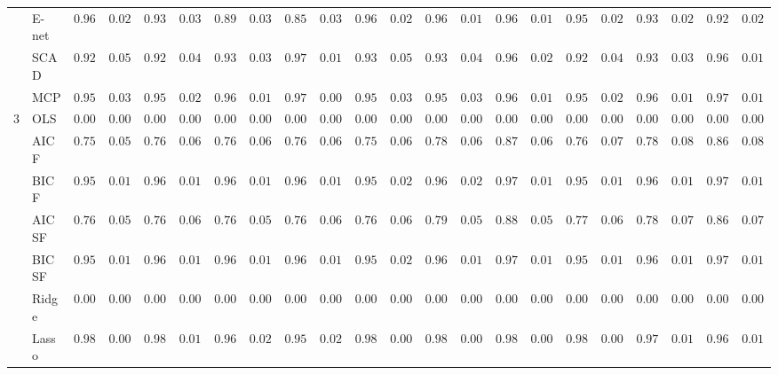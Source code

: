\begin{tabular}{ll|ll|llllll|llllll|llllll}
 & E-net  & $0.9635$ & $0.0264$ & $0.9316$ & $0.0325$ & $0.8913$ & $0.0322$ & $0.8589$ & $0.0355$ & $0.9657$ & $0.0226$ & $0.9644$ & $0.0138$ & $0.9618$ & $0.0133$ & $0.9551$ & $0.0232$ & $0.9386$ & $0.0252$ & $0.9218$ & $0.0224$ \\
 & SCAD  & $0.9227$ & $0.0595$ & $0.9282$ & $0.0421$ & $0.9399$ & $0.0310$ & $0.9729$ & $0.0104$ & $0.9359$ & $0.0539$ & $0.9344$ & $0.0465$ & $0.9665$ & $0.0258$ & $0.9208$ & $0.0498$ & $0.9397$ & $0.0361$ & $0.9625$ & $0.0165$ \\
 & MCP  & $0.9531$ & $0.0346$ & $0.9537$ & $0.0258$ & $0.9669$ & $0.0140$ & $0.9740$ & $0.0088$ & $0.9575$ & $0.0341$ & $0.9552$ & $0.0344$ & $0.9649$ & $0.0189$ & $0.9525$ & $0.0282$ & $0.9631$ & $0.0189$ & $0.9701$ & $0.0122$ \\\hline
3 & OLS  & $0.0000$ & $0.0000$ & $0.0000$ & $0.0000$ & $0.0000$ & $0.0000$ & $0.0000$ & $0.0000$ & $0.0000$ & $0.0000$ & $0.0000$ & $0.0000$ & $0.0000$ & $0.0000$ & $0.0000$ & $0.0000$ & $0.0000$ & $0.0000$ & $0.0000$ & $0.0000$ \\
 & AIC F  & $0.7575$ & $0.0567$ & $0.7624$ & $0.0660$ & $0.7613$ & $0.0603$ & $0.7647$ & $0.0629$ & $0.7569$ & $0.0645$ & $0.7880$ & $0.0625$ & $0.8727$ & $0.0661$ & $0.7687$ & $0.0734$ & $0.7819$ & $0.0801$ & $0.8625$ & $0.0894$ \\
 & BIC F  & $0.9546$ & $0.0198$ & $0.9600$ & $0.0153$ & $0.9631$ & $0.0186$ & $0.9685$ & $0.0172$ & $0.9546$ & $0.0204$ & $0.9613$ & $0.0205$ & $0.9725$ & $0.0150$ & $0.9580$ & $0.0161$ & $0.9641$ & $0.0161$ & $0.9768$ & $0.0112$ \\
 & AIC SF  & $0.7645$ & $0.0532$ & $0.7689$ & $0.0621$ & $0.7652$ & $0.0571$ & $0.7699$ & $0.0616$ & $0.7614$ & $0.0611$ & $0.7937$ & $0.0576$ & $0.8825$ & $0.0585$ & $0.7739$ & $0.0676$ & $0.7868$ & $0.0703$ & $0.8677$ & $0.0796$ \\
 & BIC SF  & $0.9551$ & $0.0193$ & $0.9601$ & $0.0153$ & $0.9634$ & $0.0184$ & $0.9689$ & $0.0168$ & $0.9546$ & $0.0204$ & $0.9615$ & $0.0197$ & $0.9732$ & $0.0137$ & $0.9579$ & $0.0163$ & $0.9640$ & $0.0163$ & $0.9768$ & $0.0112$ \\
 & Ridge  & $0.0000$ & $0.0000$ & $0.0000$ & $0.0000$ & $0.0000$ & $0.0000$ & $0.0000$ & $0.0000$ & $0.0000$ & $0.0000$ & $0.0000$ & $0.0000$ & $0.0000$ & $0.0000$ & $0.0000$ & $0.0000$ & $0.0000$ & $0.0000$ & $0.0000$ & $0.0000$ \\
 & Lasso  & $0.9882$ & $0.0064$ & $0.9849$ & $0.0119$ & $0.9687$ & $0.0246$ & $0.9502$ & $0.0214$ & $0.9884$ & $0.0076$ & $0.9882$ & $0.0043$ & $0.9811$ & $0.0091$ & $0.9867$ & $0.0068$ & $0.9792$ & $0.0136$ & $0.9682$ & $0.0151$ \\

\end{tabular}
